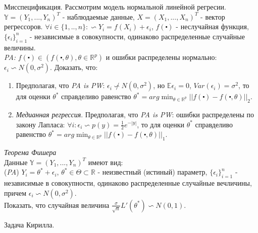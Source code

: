 \begin{problem} Мисспецификация.
Рассмотрим модель нормальной линейной регресии. $\mathbb{Y} = (Y_1,..., Y_n)^T$ - наблюдаемые данные, $X = (X_1,..., X_n)^T$ - вектор регрессоров. $\forall i \in \{1,..,n\}: \backsim Y_i = f(X_i) + \epsilon_i$, $f(\centerdot)$ - неслучайная функция, $\{\epsilon_i\}_{i = 1}^n$ - независимые в совокупности, одинаково распределенные случайные величины. \\
\textit{PA:} $f(\centerdot) \in (f(\centerdot, \theta), \theta \in \mathbb{R}^p )$ и ошибки распределены нормально: $\epsilon_i \backsim N(0, \sigma^2)$.
Доказать, что:
\begin{enumerate}
\item Предполагая, что \textit{PA is PW}: $\epsilon_i \not\backsim N(0, \sigma^2)$, но $\mathbb{E}\epsilon_i = 0$, $Var(\epsilon_i) = \sigma^2$, то для оценки $\theta^*$ справделиво равенство $\theta^* =arg\min_{\theta \in \mathbb{R}^p} ||f(\centerdot) - f(\centerdot, \theta)||_2$.\\
\item \textit{Медианная регрессия}. Предполагая, что \textit{PA is PW}: ошибки распределены по закону Лапласа: $\forall i: \epsilon_i \backsim p(y) = \frac{1}{2} e^{-|y|}$, то для оценки $\theta^*$ справделиво равенство $\theta^* = arg\min_{\theta \in \mathbb{R}^p} ||f(\centerdot) - f(\centerdot, \theta)||_1$. \\
\end{enumerate}
\end{problem}

\begin{problem} \textit{Теорема Фишера}\\
Данные $\mathbb{Y} = (Y_1,..., Y_n)^T$ имеют вид:\\
(\textit{PA}) $Y_i = \theta^* + \epsilon_i$, $\theta^* \in \Theta \subset \mathbb{R}$ - неизвестный (истиный) параметр, $\{\epsilon_i\}_{i=1}^n$ - независимые в совокупности, одинаково распределенные случайные вечличины, причем $\epsilon_i \backsim N(0, \sigma^2)$.\\
Показать, что случайная величина $\frac{\sigma}{\sqrt{n}}L'(\theta^*) \backsim N(0, 1)$.
\end{problem}

\begin{problem} Задача Кирилла.
\end{problem}

